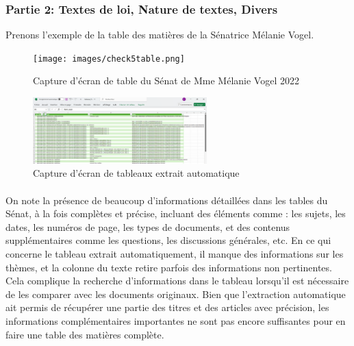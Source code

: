 \newpage
\subsubsection{Partie 2: Textes de loi, Nature de textes, Divers}

Prenons l'exemple de la table des matières de la Sénatrice Mélanie Vogel.

\begin{figure}[H]
    \centering
    \texttt{[image: images/check5table.png]}
    \caption{Capture d'écran de table du Sénat de Mme Mélanie Vogel 2022}
\end{figure}

\begin{figure}[H]
    \centering
    \includegraphics[angle=90, width=0.6\textwidth]{images/Capture d'écran 2024-09-28 034312.png}
    \caption{Capture d'écran de tableaux extrait automatique}
\end{figure}

\paragraph{} On note la présence de beaucoup d'informations détaillées dans les tables du Sénat, à la fois complètes et précise, incluant des éléments comme : les sujets, les dates, les numéros de page, les types de documents, et des contenus supplémentaires comme les questions, les discussions générales, etc. En ce qui concerne le tableau extrait automatiquement, il manque des informations sur les thèmes, et la colonne du texte retire parfois des informations non pertinentes. Cela complique la recherche d'informations dans le tableau lorsqu'il est nécessaire de les comparer avec les documents originaux. Bien que l'extraction automatique ait permis de récupérer une partie des titres et des articles avec précision, les informations complémentaires importantes ne sont pas encore suffisantes pour en faire une table des matières complète.

